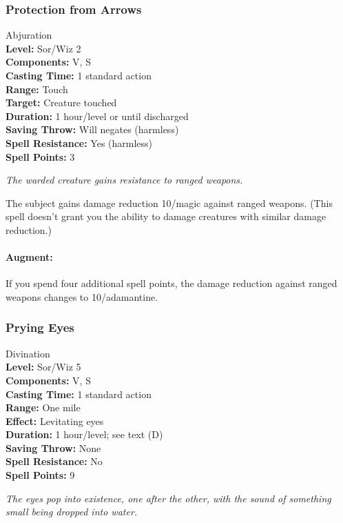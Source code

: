 \subsubsection{Protection from Arrows}
\label{Spell:ProtectionFromArrows}
Abjuration
\\ \textbf{Level:} Sor/Wiz 2
\\ \textbf{Components:} V, S
\\ \textbf{Casting Time:} 1 standard action
\\ \textbf{Range:} Touch
\\ \textbf{Target:} Creature touched
\\ \textbf{Duration:} 1 hour/level or until discharged
\\ \textbf{Saving Throw:} Will negates (harmless)
\\ \textbf{Spell Resistance:} Yes (harmless)
\\ \textbf{Spell Points:} 3

\emph{The warded creature gains resistance to ranged weapons. }

The subject gains damage reduction 10/magic against ranged weapons. 
(This spell doesn't grant you the ability to damage creatures with similar damage reduction.) 

\paragraph{Augment:} If you spend four additional spell points, the damage reduction against ranged weapons changes to 10/adamantine.

\subsubsection{Prying Eyes}
\label{Spell:PryingEyes}
Divination
\\ \textbf{Level:} Sor/Wiz 5
\\ \textbf{Components:} V, S
\\ \textbf{Casting Time:} 1 standard action
\\ \textbf{Range:} One mile
\\ \textbf{Effect:} Levitating eyes
\\ \textbf{Duration:} 1 hour/level; see text (D)
\\ \textbf{Saving Throw:} None
\\ \textbf{Spell Resistance:} No
\\ \textbf{Spell Points:} 9

\emph{The eyes pop into existence, one after the other, with the sound of something small being dropped into water.}

